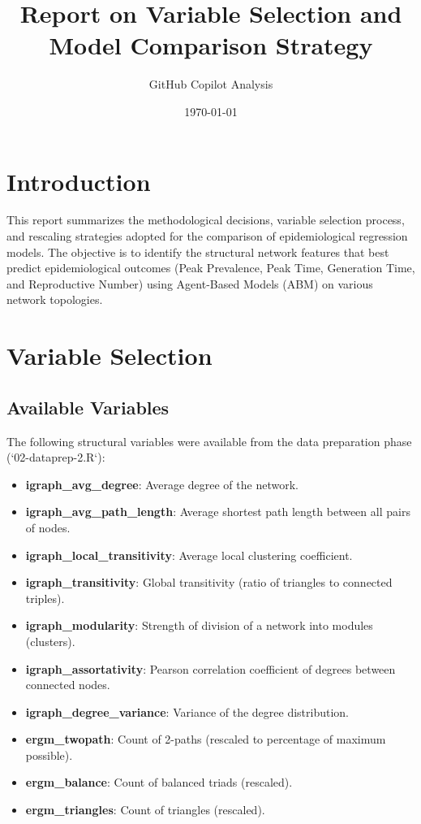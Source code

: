 \documentclass{article}
\title{Report on Variable Selection and Model Comparison Strategy}
\author{GitHub Copilot Analysis}
\date{\today}
\begin{document}
\maketitle

\section{Introduction}
This report summarizes the methodological decisions, variable selection process, and rescaling strategies adopted for the comparison of epidemiological regression models. The objective is to identify the structural network features that best predict epidemiological outcomes (Peak Prevalence, Peak Time, Generation Time, and Reproductive Number) using Agent-Based Models (ABM) on various network topologies.

\section{Variable Selection}

\subsection{Available Variables}
The following structural variables were available from the data preparation phase (`02-dataprep-2.R`):

\begin{itemize}
    \item \textbf{igraph\_avg\_degree}: Average degree of the network.
    \item \textbf{igraph\_avg\_path\_length}: Average shortest path length between all pairs of nodes.
    \item \textbf{igraph\_local\_transitivity}: Average local clustering coefficient.
    \item \textbf{igraph\_transitivity}: Global transitivity (ratio of triangles to connected triples).
    \item \textbf{igraph\_modularity}: Strength of division of a network into modules (clusters).
    \item \textbf{igraph\_assortativity}: Pearson correlation coefficient of degrees between connected nodes.
    \item \textbf{igraph\_degree\_variance}: Variance of the degree distribution.
    \item \textbf{ergm\_twopath}: Count of 2-paths (rescaled to percentage of maximum possible).
    \item \textbf{ergm\_balance}: Count of balanced triads (rescaled).
    \item \textbf{ergm\_triangles}: Count of triangles (rescaled).
\end{itemize}
\end{document}
